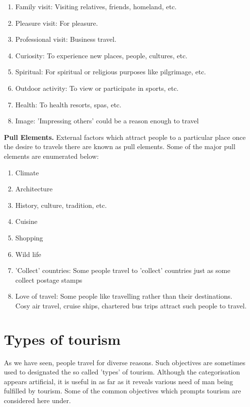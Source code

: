\begin{enumerate}
  \item Family visit: Visiting relatives, friends, homeland, etc.
  \item Pleasure visit: For pleasure.
  \item Professional visit: Business travel.
  \item Curiosity: To experience new places, people, cultures, etc.
  \item Spiritual: For spiritual or religious purposes like pilgrimage, etc.
  \item Outdoor activity: To view or participate in sports, etc.
  \item Health: To health resorts, spas, etc.
  \item Image: 'Impressing others' could be a reason enough to travel
\end{enumerate}

\textbf{Pull Elements.} External factors which attract people to a particular place once the desire to travels there are known as pull elements. Some of the major pull elements are enumerated below:

\begin{enumerate}
  \item Climate
  \item Architecture
  \item History, culture, tradition, etc.
  \item Cuisine
  \item Shopping
  \item Wild life
  \item 'Collect' countries: Some people travel to 'collect' countries just as some collect postage stamps
  \item Love of travel: Some people like travelling rather than their destinations. Cosy air travel, cruise ships, chartered bus trips attract such people to travel.
\end{enumerate}

\section{Types of tourism} %
\label{sec:types}

As we have seen, people travel for diverse reasons. Such objectives are sometimes used to designated the so called 'types' of tourism. Although the categorisation appears artificial, it is useful in as far as it reveals various need of man being fulfilled by tourism. Some of the common objectives which prompts tourism are considered here under.


